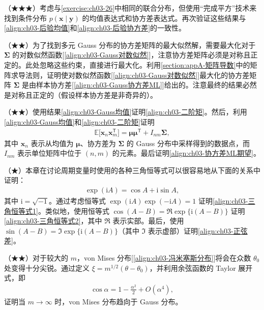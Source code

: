 \documentclass[../../main.tex]{subfiles}
\begin{document}
\begin{exercise}\label{exercise:ch03-27}
（★★★）考虑与\cref{exercise:ch03-26}中相同的联合分布，但使用“完成平方”技术来找到条件分布 $p(\boldsymbol{x}\mid\boldsymbol{y})$ 的均值表达式和协方差表达式。再次验证这些结果与\eqref{align:ch03-后验均值}和\eqref{align:ch03-后验协方差}的一致性。
\end{exercise}

\begin{exercise}\label{exercise:ch03-28}
（★★）为了找到多元 Gauss 分布的协方差矩阵的最大似然解，需要最大化对于 $\boldsymbol{\Sigma}$ 的对数似然函数[\eqref{align:ch03-Gauss对数似然}]，注意协方差矩阵必须是对称且正定的。此处忽略这些约束，直接进行最大化。利用\cref{section:appA-矩阵导数}中的矩阵求导法则，证明使对数似然函数[\eqref{align:ch03-Gauss对数似然}]最大化的协方差矩阵 $\boldsymbol{\Sigma}$ 是由样本协方差[\eqref{align:ch03-Gauss协方差ML}]给出的。注意最终的结果必然是对称且正定的（假设样本协方差是非奇异的）。
\end{exercise}

\begin{exercise}\label{exercise:ch03-29}
（★★）使用结果\eqref{align:ch03-Gauss均值}证明\eqref{align:ch03-二阶矩}。然后，利用\eqref{align:ch03-Gauss均值}和\eqref{align:ch03-二阶矩}证明
\begin{align*}
\mathbb{E}\bigl[\boldsymbol{x}_n\boldsymbol{x}_m^{\mathsf{T}}\bigr]=\boldsymbol{\mu}\boldsymbol{\mu}^{\mathsf{T}}+I_{nm}\boldsymbol{\Sigma},
\end{align*}
其中 $\boldsymbol{x}_n$ 表示从均值为 $\boldsymbol{\mu}$、协方差为 $\boldsymbol{\Sigma}$ 的 Gauss 分布中采样得到的数据点，而 $I_{nm}$ 表示单位矩阵中位于 $(n,m)$ 的元素。最后证明\eqref{align:ch03-协方差ML期望}。
\end{exercise}

\begin{exercise}\label{exercise:ch03-30}
（★）本章在讨论周期变量时使用的各种三角恒等式可以很容易地从下面的关系中证明：
\begin{align*}
\exp(\mathrm{i}A)=\cos A+\mathrm{i}\sin A,
\end{align*}
其中 $\mathrm{i}=\sqrt{-1}$。通过考虑恒等式 $\exp(\mathrm{i}A)\exp(-\mathrm{i}A)=1$ 证明\eqref{align:ch03-三角恒等式1}。类似地，使用恒等式 $\cos(A-B)=\Re\exp\{\mathrm{i}(A-B)\}$ 证明\eqref{align:ch03-三角恒等式2}，其中 $\Re$ 表示实部。最后，使用 $\sin(A-B)=\Im\exp\{\mathrm{i}(A-B)\}$（其中 $\Im$ 表示虚部）证明\eqref{align:ch03-正弦差}。
\end{exercise}

\begin{exercise}\label{exercise:ch03-31}
（★★）对于较大的 $m$，von Mises 分布[\eqref{align:ch03-冯米塞斯分布}]将会在众数 $\theta_0$ 处变得十分尖锐。通过定义 $\xi=m^{1/2}(\theta-\theta_0)$，并利用余弦函数的 Taylor 展开式，即
\begin{align*}
\cos\alpha=1-\frac{\alpha^{2}}{2}+O(\alpha^{4}),
\end{align*}
证明当 $m\to\infty$ 时，von Mises 分布趋向于 Gauss 分布。
\end{exercise}
\end{document}
